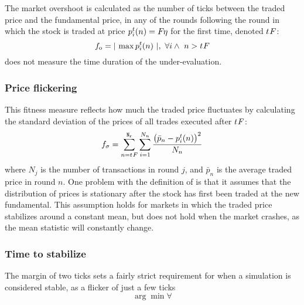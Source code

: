 The market overshoot is calculated as the number of ticks between the traded price and the fundamental price, in any of the rounds following the round in which the stock is traded at price $\tradeprice{n}{i} = \fundamentalprice{\eta}$ for the first time, denoted $\round{F}$: 
\begin{equation}\label{eq:overshoot}
\overshoot = \lvert\ \max \tradeprice{n}{i}\ \rvert, \ \forall i \wedge \ n > \round{F}
\end{equation}
\overshoot{} does not measure the time duration of the under-evaluation. 

\subsubsection{Price flickering}
This fitness measure reflects how much the traded price fluctuates by calculating the standard deviation of the prices of all trades executed after $\round{F}$:
\begin{equation}\label{eq:stdev}
\stdev = \sum\limits_{n = \round{F}}^{\nrounds}  \sum\limits_{i=1}^{N_n} \frac{\big(\bar{p}_n - \tradeprice{n}{i}\big)^2}{N_n}
\end{equation}
where $N_j$ is the number of transactions in round $j$, and $\bar{p}_n$ is the average traded price in round $n$. One problem with the definition of \stdev{} is that it assumes that the distribution of prices is stationary after the stock has first been traded at the new fundamental. This assumption holds for markets in which the traded price stabilizes around a constant mean, but does not hold when the market crashes, as the mean statistic will constantly change.

\subsubsection{Time to stabilize}
The margin of two ticks sets a fairly strict requirement for when a simulation is considered stable, as a flicker of just a few ticks 
\begin{equation}\label{eq:roundstable}
\arg \min \forall 
\end{equation}




